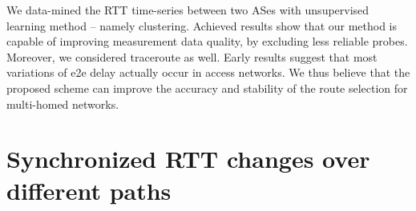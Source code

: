 We data-mined the RTT time-series between two ASes with unsupervised learning method -- namely clustering.
Achieved results show that our method is capable of improving measurement data quality, by excluding less reliable probes.
Moreover, we considered traceroute as well. 
Early results suggest that most variations of e2e delay actually occur in access networks. We thus believe that the proposed scheme can improve the accuracy and stability of the route selection for multi-homed networks.
\section{Synchronized RTT changes over different paths}